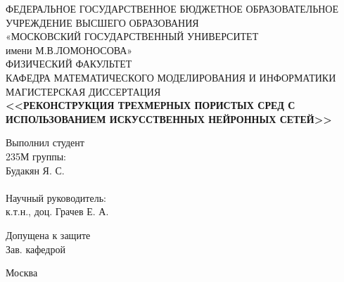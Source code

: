 \begin{titlepage} %
	
	\begin{center}
		\small{ФЕДЕРАЛЬНОЕ ГОСУДАРСТВЕННОЕ БЮДЖЕТНОЕ ОБРАЗОВАТЕЛЬНОЕ}\\ 
		УЧРЕЖДЕНИЕ ВЫСШЕГО ОБРАЗОВАНИЯ\\
		«МОСКОВСКИЙ ГОСУДАРСТВЕННЫЙ УНИВЕРСИТЕТ\\
		имени М.В.ЛОМОНОСОВА»\\
		\hfill \break
		ФИЗИЧЕСКИЙ ФАКУЛЬТЕТ \\
		\hfill \break
		КАФЕДРА МАТЕМАТИЧЕСКОГО МОДЕЛИРОВАНИЯ И ИНФОРМАТИКИ\\
		\hfill \break
		\hfill \break
		\hfill \break
		\hfill \break
		МАГИСТЕРСКАЯ ДИССЕРТАЦИЯ\\
		\hfill \break
		\textbf{<<РЕКОНСТРУКЦИЯ ТРЕХМЕРНЫХ ПОРИСТЫХ СРЕД С ИСПОЛЬЗОВАНИЕМ ИСКУССТВЕННЫХ НЕЙРОННЫХ СЕТЕЙ>>}\\
	\end{center}
	
	\hfill \break

	\begin{flushright}
		Выполнил студент \\
		235М группы:\\
		Будакян Я. С.\\
		\underline{\hspace{3cm}}\\
		\hfill \break
		Научный руководитель: \\
		к.т.н., доц. Грачев Е. А.\\
		\underline{\hspace{3cm}}
	\end{flushright}
	
	\begin{flushleft}
		Допущена к защите\\
		Зав. кафедрой \underline{\hspace{3cm}}\\
	\end{flushleft}
	\hfill \break
	\begin{center}
		Москва \\
		\hfill {}
	\end{center}
	
	\thispagestyle{empty} %
	

\end{titlepage}  %